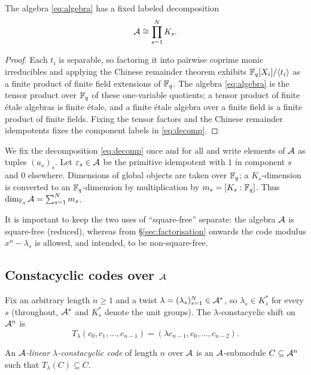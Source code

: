 \begin{proposition}\label{prop:decomposition}
The algebra \eqref{eq:algebra} has a fixed labeled decomposition
\begin{equation}\label{eq:decomp}
\mathcal A\cong\prod_{s=1}^{N}K_s .
\end{equation}
\end{proposition}

\begin{proof}
Each $t_i$ is separable, so factoring it into pairwise coprime monic irreducibles
and applying the Chinese remainder theorem exhibits
$\mathbb F_q[X_i]/\langle t_i\rangle$ as a finite product of finite field extensions of
$\mathbb F_q$.  The algebra \eqref{eq:algebra} is the tensor product over $\mathbb F_q$ of
these one-variable quotients; a tensor product of finite \'{e}tale algebras is
finite \'{e}tale, and a finite \'{e}tale algebra over a finite field is a finite
product of finite fields.  Fixing the tensor factors and the Chinese remainder
idempotents fixes the component labels in \eqref{eq:decomp}.
\end{proof}

We fix the decomposition \eqref{eq:decomp} once and for all and write elements of
$\mathcal A$ as tuples $(a_s)_s$.  Let $\varepsilon_s\in\mathcal A$ be the primitive idempotent
with $1$ in component $s$ and $0$ elsewhere.  Dimensions of global objects are
taken over $\mathbb F_q$; a $K_s$-dimension is converted to an $\mathbb F_q$-dimension by
multiplication by $m_s=[K_s:\mathbb F_q]$.  Thus
$\dim_{\mathbb F_q}\mathcal A=\sum_{s=1}^{N}m_s$.

It is important to keep the two uses of ``square-free'' separate: the algebra
$\mathcal A$ is square-free (reduced), whereas from \S\ref{sec:factorisation} onwards the
code modulus $x^n-\lambda_s$ is allowed, and intended, to be non-square-free.

\subsection{Constacyclic codes over \texorpdfstring{$\mathcal A$}{A}}\label{sec:codes}

Fix an arbitrary length $n\geq1$ and a twist
$\lambda=(\lambda_s)_{s=1}^{N}\in\mathcal A^\ast$, so $\lambda_s\in K_s^\ast$ for every
$s$ (throughout, $\mathcal A^\ast$ and $K_s^\ast$ denote the unit groups).  The $\lambda$-constacyclic shift on $\mathcal A^n$ is
\[
T_\lambda(c_0,c_1,\ldots,c_{n-1})
   =(\lambda c_{n-1},c_0,\ldots,c_{n-2}).
\]

\begin{definition}\label{def:constacyclic}
An \emph{$\mathcal A$-linear $\lambda$-constacyclic code} of length $n$ over $\mathcal A$ is an
$\mathcal A$-submodule $C\subseteq\mathcal A^n$ such that $T_\lambda(C)\subseteq C$.
\end{definition}


